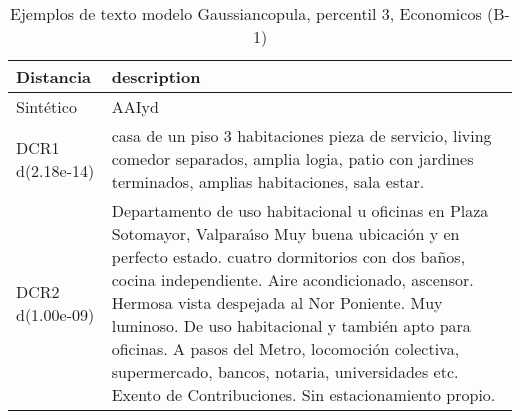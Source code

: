 \begin{table}[H]
\centering
\fontsize{10}{14}\selectfont
\caption{Ejemplos de texto modelo Gaussiancopula, percentil 3, Economicos (B-1)}
\label{table-example-economicos-b-1-gaussiancopula-3p-text}
\begin{tabular}{|l|m{35em}|}
\hline
\rowcolor[gray]{0.8}
Distancia & description \\
\hline Sintético & AAIyd \\
\hline DCR1 d(2.18e-14) & casa de un piso 3 habitaciones pieza de servicio, living comedor separados, amplia logia, patio con jardines terminados, amplias habitaciones, sala estar. \\
\hline DCR2 d(1.00e-09) & Departamento de uso habitacional u oficinas en Plaza Sotomayor, Valpara{\'\i}so
Muy buena ubicaci\'on y en perfecto estado.
cuatro dormitorios con dos ba\~nos, cocina independiente.
Aire acondicionado, ascensor.
Hermosa vista despejada al Nor  Poniente. Muy luminoso. 
De uso habitacional y tambi\'en apto para oficinas. A pasos del Metro, locomoci\'on colectiva, supermercado, bancos, notaria, universidades etc.
Exento de Contribuciones.
Sin estacionamiento propio.
 \\
\hline
\end{tabular}
\end{table}
